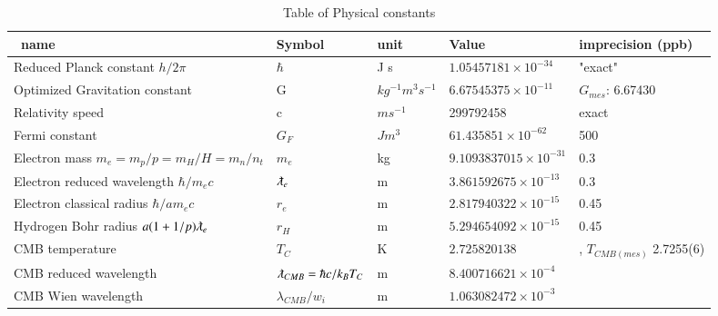 \documentclass[a4paper,9pt]{article}
\newcounter{col}
\begin{document}
 
 \begin{table}
\caption[Table \ref{tab:3:table3}: Physical constants]{Table of Physical constants}
\label{tab:3:table3}
  \hskip-2.0cm\begin{tabular}{lllll}
    \toprule
    \cmidrule(r){1-5}
    \ name & Symbol  & unit  & Value & imprecision (ppb) \\
    \midrule
  
 
 Reduced Planck constant $h/2\pi$    & $\hbar$   & J s   & $1.05457181 \times 10^{-34}$ & "exact" \\
 Optimized Gravitation constant   & G & $kg^{-1} m^3 s^{-1}$  & $6.67545375\times 10^{-11}$  & \cite{Sanchez2} $G_{mes}$: 6.67430 \\
 Relativity speed     & c   & $m s^{-1}$   & 299792458 & exact \\
 Fermi constant  & $G_F$ & $J m^3$   & $61.435851 \times 10^{-62}$  &  500\\
 Electron mass $m_e = m_p/p = m_H/H = m_n/n_t$  & $m_e$ & kg  & $9.1093837015 \times 10^{-31}$  &  0.3\\
 Electron reduced wavelength $\hbar/m_ec$ & $\lambdabar_e$ &  m   & $3.861592675\times 10^{-13}$  & 0.3\\
 Electron classical radius $\hbar/am_ec$ & $r_e$ &  m   & $2.817940322\times 10^{-15}$  & 0.45\\
 Hydrogen Bohr radius $a(1+1/p)\lambdabar_e$ & $r_H$ &  m   & $5.294654092 \times 10^{-15}$  & 0.45\\
 
 
 
 
   CMB temperature & $T_{C}$ & K & $2.725820138$ & \cite{Sanchez2}, $T_{CMB(mes)} $ 2.7255(6)  \\
   CMB reduced wavelength & $\lambdabar_{CMB} = \hbar c/ k_B T_C $ & m & $8.400716621 \times 10^{-4} $ & \cite{Sanchez2} \\
   CMB Wien wavelength & $\lambda_{CMB}/w_i $ & m & $1.063082472  \times 10^{-3} $ & \cite{Sanchez2} \\
   

\end{tabular}
\end{table}
\end{document}
